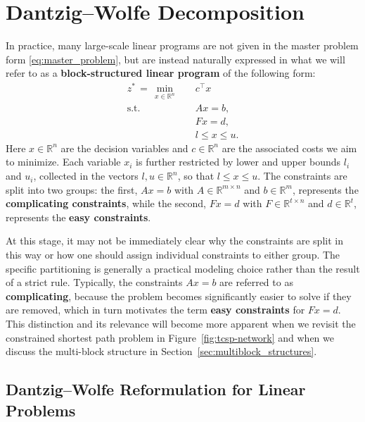 \documentclass{book}
\theoremstyle{definition}
\numberwithin{algorithm_}{chapter}
\begin{document}
\section{Dantzig–Wolfe Decomposition}
\label{sec:dantzig-wolfe}

In practice, many large-scale linear programs are not given in the master problem form \eqref{eq:master_problem}, but are instead naturally expressed in what we will refer to as a \textbf{block-structured linear program} of the following form:
\begin{subequations}\label{eq:block-lp}
\begin{align}
z^* \, = \, \min_{x \in \mathbb{R}^n} \quad & c^\top x \label{eq:obj} \\[1mm]
\text{s.t.} \quad 
& Ax = b, \label{eq:complicating} \\[0.5mm]
& Fx = d, \label{eq:easy} \\[0.5mm]
& l \le x \le u. \label{eq:bounds}
\end{align}
\end{subequations}
Here $x \in \mathbb{R}^n$ are the decision variables and $c \in \mathbb{R}^n$ are the associated costs we aim to minimize. Each variable $x_i$ is further restricted by lower and upper bounds $l_i$ and $u_i$, collected in the vectors $l, u \in \mathbb{R}^n$, so that $l \le x \le u$. The constraints are split into two groups: the first, $Ax = b$ with $A \in \mathbb{R}^{m \times n}$ and $b \in \mathbb{R}^m$, represents the \textbf{complicating constraints}, while the second, $Fx = d$ with $F \in \mathbb{R}^{t \times n}$ and $d \in \mathbb{R}^t$, represents the \textbf{easy constraints}.

\bigskip

At this stage, it may not be immediately clear why the constraints are split in this way or how one should assign individual constraints to either group. The specific partitioning is generally a practical modeling choice rather than the result of a strict rule. Typically, the constraints $Ax = b$ are referred to as \textbf{complicating}, because the problem becomes significantly easier to solve if they are removed, which in turn motivates the term \textbf{easy constraints} for $Fx = d$. This distinction and its relevance will become more apparent when we revisit the constrained shortest path problem in Figure~\ref{fig:tcsp-network} and when we discuss the multi-block structure in Section~\ref{sec:multiblock_structures}.


\subsection{Dantzig--Wolfe Reformulation for Linear Problems}
\end{document}
